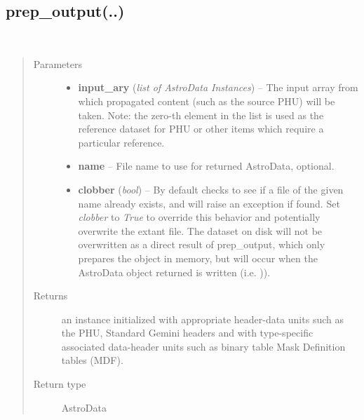 \documentclass[letterpaper,10pt,english]{sphinxmanual}
\begin{document}
\subsection{prep\_output(..)}
\label{chapter_AstroDataClass:prep-output}

\begin{fulllineitems}
\label{chapter_AstroDataClass:astrodata.data.prep_output}~\begin{quote}\begin{description}
\item[{Parameters}] \leavevmode\begin{itemize}
\item {} 
\textbf{input\_ary} (\emph{list of AstroData Instances}) -- The input array from which propagated content (such as
the  source PHU) will be taken. Note: the zero-th element in the list
is  used as the reference dataset for PHU or other items which require
a particular reference.

\item {} 
\textbf{name} -- File name to use for returned AstroData, optional.

\item {} 
\textbf{clobber} (\emph{bool}) -- By default  checks to see if a file of the
given name already exists, and will raise an exception if found.
Set \emph{clobber} to \emph{True} to override this behavior and potentially
overwrite the extant file.  The dataset on disk will not be overwritten
as a direct result of prep\_output, which only prepares the object
in memory, but will occur when the AstroData object returned is 
written (i.e. )).

\end{itemize}

\item[{Returns}] \leavevmode
an  instance initialized with appropriate
header-data units such as the PHU, Standard Gemini headers
and with type-specific associated  data-header units such as
binary table Mask Definition tables (MDF).

\item[{Return type}] \leavevmode
AstroData

\end{description}\end{quote}


\end{fulllineitems}
\end{document}
